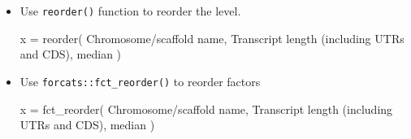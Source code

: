 \documentclass[
]{article}
\newenvironment{Shaded}{}{}
\newcommand{\AttributeTok}[1]{\textcolor[rgb]{0.49,0.56,0.16}{#1}}
\newcommand{\FunctionTok}[1]{\textcolor[rgb]{0.02,0.16,0.49}{#1}}
\newcommand{\NormalTok}[1]{#1}
\newcommand{\OtherTok}[1]{\textcolor[rgb]{0.00,0.44,0.13}{#1}}
\newcommand{\StringTok}[1]{\textcolor[rgb]{0.25,0.44,0.63}{#1}}
\begin{document}
\begin{itemize}
\item
  Use \texttt{reorder()} function to reorder the level.

\begin{Shaded}
\begin{Highlighting}[]
\NormalTok{x }\OtherTok{=} \FunctionTok{reorder}\NormalTok{( }
  \StringTok{\textasciigrave{}}\AttributeTok{Chromosome/scaffold name}\StringTok{\textasciigrave{}}\NormalTok{,}
  \StringTok{\textasciigrave{}}\AttributeTok{Transcript length (including UTRs and CDS)}\StringTok{\textasciigrave{}}\NormalTok{,}
\NormalTok{  median}
\NormalTok{)}
\end{Highlighting}
\end{Shaded}
\end{itemize}

\begin{itemize}
\item
  Use \texttt{forcats::fct\_reorder()} to reorder factors

\begin{Shaded}
\begin{Highlighting}[]
\NormalTok{x }\OtherTok{=} \FunctionTok{fct\_reorder}\NormalTok{( }
  \StringTok{\textasciigrave{}}\AttributeTok{Chromosome/scaffold name}\StringTok{\textasciigrave{}}\NormalTok{,}
  \StringTok{\textasciigrave{}}\AttributeTok{Transcript length (including UTRs and CDS)}\StringTok{\textasciigrave{}}\NormalTok{,}
\NormalTok{  median }
\NormalTok{)}
\end{Highlighting}
\end{Shaded}
\end{itemize}
\end{document}
